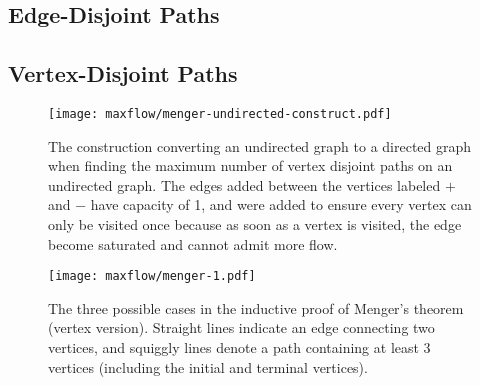 \subsection{Edge-Disjoint Paths}

\subsection{Vertex-Disjoint Paths}

\begin{figure}[htbp]
    \centering
    \texttt{[image: maxflow/menger-undirected-construct.pdf]}
    \caption{The construction converting an undirected graph to a directed graph when finding the maximum number of vertex disjoint paths on an undirected graph. The edges added between the vertices labeled $+$ and $-$ have capacity of 1, and were added to ensure every vertex can only be visited once because as soon as a vertex is visited, the edge become saturated and cannot admit more flow.}
    \label{fig:menger-undirected-construct}
\end{figure}

\begin{figure}[htbp]
    \centering
    \texttt{[image: maxflow/menger-1.pdf]}
    \caption{The three possible cases in the inductive proof of Menger's theorem (vertex version). Straight lines indicate an edge connecting two vertices, and squiggly lines denote a path containing at least 3 vertices (including the initial and terminal vertices).}
    \label{fig:menger-undirected-1}
\end{figure}